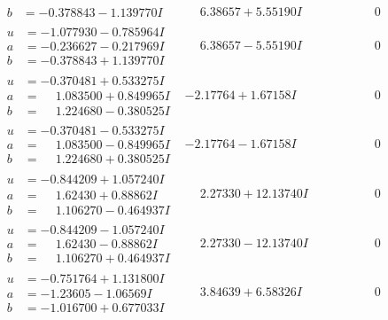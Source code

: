 \documentclass[1p]{elsarticle_modified}
\theoremstyle{definition}
\begin{document}
$$\begin{array}{c|c|c}
\begin{aligned}
b &= -0.378843 - 1.139770 I\end{aligned}
 & \phantom{-}6.38657 + 5.55190 I & \phantom{-0.000000 } 0 \\ \hline\begin{aligned}
u &= -1.077930 - 0.785964 I \\
a &= -0.236627 - 0.217969 I \\
b &= -0.378843 + 1.139770 I\end{aligned}
 & \phantom{-}6.38657 - 5.55190 I & \phantom{-0.000000 } 0 \\ \hline\begin{aligned}
u &= -0.370481 + 0.533275 I \\
a &= \phantom{-}1.083500 + 0.849965 I \\
b &= \phantom{-}1.224680 - 0.380525 I\end{aligned}
 & -2.17764 + 1.67158 I & \phantom{-0.000000 } 0 \\ \hline\begin{aligned}
u &= -0.370481 - 0.533275 I \\
a &= \phantom{-}1.083500 - 0.849965 I \\
b &= \phantom{-}1.224680 + 0.380525 I\end{aligned}
 & -2.17764 - 1.67158 I & \phantom{-0.000000 } 0 \\ \hline\begin{aligned}
u &= -0.844209 + 1.057240 I \\
a &= \phantom{-}1.62430 + 0.88862 I \\
b &= \phantom{-}1.106270 - 0.464937 I\end{aligned}
 & \phantom{-}2.27330 + 12.13740 I & \phantom{-0.000000 } 0 \\ \hline\begin{aligned}
u &= -0.844209 - 1.057240 I \\
a &= \phantom{-}1.62430 - 0.88862 I \\
b &= \phantom{-}1.106270 + 0.464937 I\end{aligned}
 & \phantom{-}2.27330 - 12.13740 I & \phantom{-0.000000 } 0 \\ \hline\begin{aligned}
u &= -0.751764 + 1.131800 I \\
a &= -1.23605 - 1.06569 I \\
b &= -1.016700 + 0.677033 I\end{aligned}
 & \phantom{-}3.84639 + 6.58326 I & \phantom{-0.000000 } 0 \\ \hline\begin{aligned}

\end{aligned}
\end{array}$$
\end{document}
